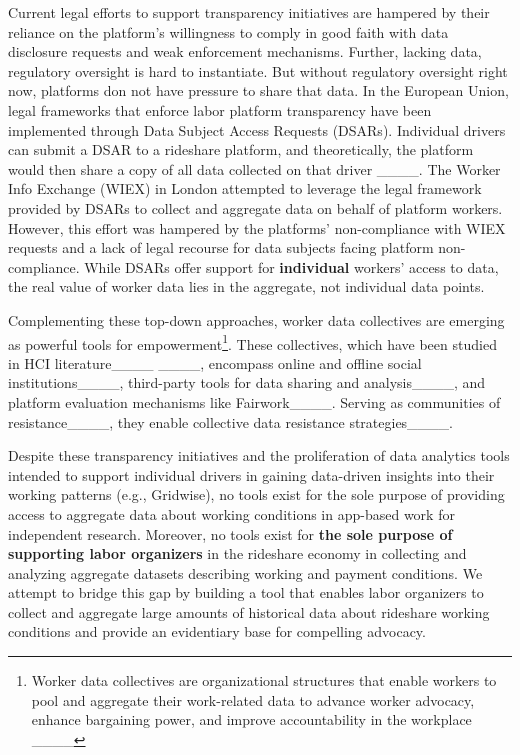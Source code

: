 Current legal efforts to support transparency initiatives are hampered by their reliance on the platform's willingness to comply in good faith with data disclosure requests and weak enforcement mechanisms. Further, lacking data, regulatory oversight is hard to instantiate. But without regulatory oversight right now, platforms don not have pressure to share that data. In the European Union, legal frameworks that enforce labor platform transparency have been implemented through Data Subject Access Requests (DSARs). Individual drivers can submit a DSAR to a rideshare platform, and theoretically, the platform would then share a copy of all data collected on that driver ____. The Worker Info Exchange (WIEX) in London attempted to leverage the legal framework provided by DSARs to collect and aggregate data on behalf of platform workers. However, this effort was hampered by the platforms' non-compliance with WIEX requests and a lack of legal recourse for data subjects facing platform non-compliance. While DSARs offer support for \textbf{individual} workers' access to data, the real value of worker data lies in the aggregate, not individual data points.

Complementing these top-down approaches, worker data collectives are emerging as powerful tools for empowerment\footnote{Worker data collectives are organizational structures that enable workers to pool and aggregate their work-related data to advance worker advocacy, enhance bargaining power, and improve accountability in the workplace ____}. These collectives, which have been studied in HCI literature____ ____, encompass online and offline social institutions____, third-party tools for data sharing and analysis____, and platform evaluation mechanisms like Fairwork____. Serving as communities of resistance____, they enable collective data resistance strategies____.

Despite these transparency initiatives and the proliferation of data analytics tools intended to support individual drivers in gaining data-driven insights into their working patterns (e.g., Gridwise), no tools exist for the sole purpose of providing access to aggregate data about working conditions in app-based work for independent research. Moreover, no tools exist for \textbf{the sole purpose of supporting labor organizers} in the rideshare economy in collecting and analyzing aggregate datasets describing working and payment conditions. We attempt to bridge this gap by building a tool that enables labor organizers to collect and aggregate large amounts of historical data about rideshare working conditions and provide an evidentiary base for compelling advocacy.

